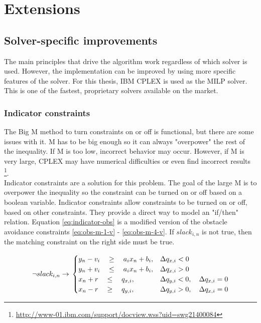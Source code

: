 \chapter{Extensions}
\label{section:extensions}

\section{Solver-specific improvements}
The main principles that drive the algorithm work regardless of which solver is used. However, the implementation can be improved by using more specific features of the solver. For this thesis, IBM CPLEX is used as the MILP solver. This is one of the fastest, proprietary solvers available on the market. 

\subsection{Indicator constraints}
The Big M method to turn constraints on or off is functional, but there are some issues with it. M has to be big enough so it can always "overpower" the rest of the inequality. If M is too low, incorrect behavior may occur. However, if M is very large, CPLEX may have numerical difficulties or even find incorrect results \footnote{\url{http://www-01.ibm.com/support/docview.wss?uid=swg21400084}}. \\
Indicator constraints are a solution for this problem. The goal of the large M is to overpower the inequality so the constraint can be turned on or off based on a boolean variable. Indicator constraints allow constraints to be turned on or off, based on other constraints. They provide a direct way to model an "if/then" relation. Equation \ref{eq:indicator-obs} is a modified version of the obstacle avoidance constraints \ref{eq:obs-m-1-v} - \ref{eq:obs-m-4-v}. If $slack_{i,n}$ is not true, then the matching constraint on the right side must be true.

\begin{equation}
\label{eq:indicator-obs}
\neg slack_{i,n} \rightarrow \\
\begin{cases}
y_{n} -  v_i \quad \geq 
\quad a_{i} x_{n} + b_{i},  	
& \Delta q_{x,i} < 0 							 	
 \\
y_{n} + v_i \quad \leq 
\quad a_{i} x_{n} + b_{i},
& \Delta q_{x,i} > 0 							 	
 \\
x_{n} + r \quad \leq
\quad  q_{x,i}, 		
& \Delta q_{y,i} < 0, \quad \Delta q_{x,i} = 0 	
 \\
x_{n} - r \quad \geq 
\quad q_{y,i},  		
& \Delta q_{y,i} > 0, \quad \Delta q_{x,i} = 0 	
\end{cases}
\end{equation}

